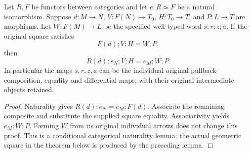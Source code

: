 \begin{lemma}
\label{lem:kn-native-restricted-differential-word-naturality}
\leanok
Let $R,F$ be functors between categories and let $e:R\simeq F$ be a
natural isomorphism. Suppose $d:M\to N$, $V:F(N)\to T_0$,
$H:T_0\to T$, and $P:L\to T$ are morphisms. Let
$W:F(M)\to L$ be the specified well-typed word $s;r;z;a$.
If the original square satisfies
\[
 F(d);V;H=W;P,
\]
then
\[
 R(d);e_N;V;H=e_M;W;P.
\]
In particular the maps $s,r,z,a$ can be the individual original
pullback-composition, equality and differential maps, with their original
intermediate objects retained.
\end{lemma}
\begin{proof}
Naturality gives $R(d);e_N=e_M;F(d)$. Associate the remaining composite
and substitute the supplied square equality. Associativity yields
$e_M;W;P$. Forming $W$ from its original individual arrows does not
change this proof. This is a conditional categorical naturality lemma;
the actual geometric square in the theorem below is produced by the
preceding lemma.
\end{proof}

